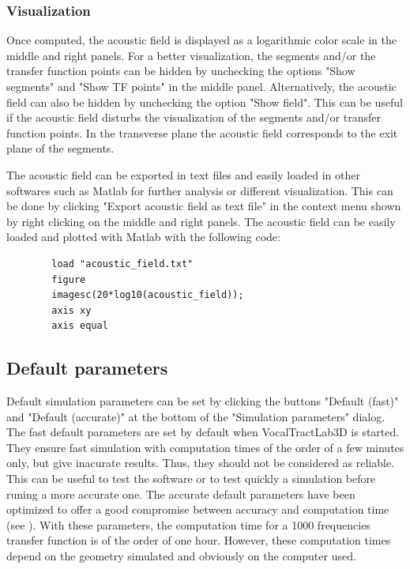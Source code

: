 \documentclass[]{article}
\begin{document}
	\subsubsection{Visualization}
	
	Once computed, the acoustic field is displayed as a logarithmic color scale in the
	middle and right panels. 
	For a better visualization, the segments and/or the transfer function points can
	be hidden by unchecking the options "Show segments" and "Show TF points" in the middle
	panel. 
	Alternatively, the acoustic field can also be hidden by unchecking the option 
	"Show field".
	This can be useful if the acoustic field disturbs the visualization of the segments
	and/or transfer function points.
	In the transverse plane the acoustic field corresponds to the exit plane of the segments.
	
	The acoustic field can be exported in text files and easily loaded in other softwares 
	such as Matlab for further analysis or different visualization.
	This can be done by clicking "Export acoustic field as text file" in the context 
	menu shown by right clicking on the middle and right panels.
	The acoustic field can be easily loaded and plotted with Matlab with the following code:
	\begin{lstlisting}
		load "acoustic_field.txt"
		figure
		imagesc(20*log10(acoustic_field));
		axis xy
		axis equal
	\end{lstlisting}
	
	\subsection{Default parameters}
	
	Default simulation parameters can be set by clicking the buttons "Default (fast)" and
	"Default (accurate)" at the bottom of the "Simulation parameters" dialog.
	The fast default parameters are set by default when 
	VocalTractLab3D is started.
	They ensure fast simulation with computation times of the order of a few minutes only,
	but give inacurate results. 
	Thus, they should not be considered as reliable.
	This can be useful to test the software or to test quickly a simulation before runing 
	a more accurate one.
	The accurate default parameters have been optimized to offer a good compromise between
	accuracy and computation time (see \textcite{blandin2022efficient}). 
	With these parameters, the computation time for a 1000 frequencies transfer function 
	is of the order of one hour.
	However, these computation times depend on the geometry simulated and obviously on the
	computer used.
	
\end{document}
